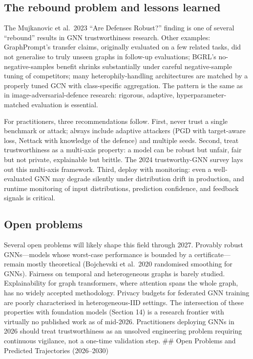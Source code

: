 \subsection{The rebound problem and lessons learned}\label{the-rebound-problem-and-lessons-learned}

The Mujkanovic et al.~2023 ``Are Defenses Robust?'' finding is one of several ``rebound'' results in GNN trustworthiness research. Other examples: GraphPrompt's transfer claims, originally evaluated on a few related tasks, did not generalise to truly unseen graphs in follow-up evaluations; BGRL's no-negative-samples benefit shrinks substantially under careful negative-sample tuning of competitors; many heterophily-handling architectures are matched by a properly tuned GCN with class-specific aggregation. The pattern is the same as in image-adversarial-defence research: rigorous, adaptive, hyperparameter-matched evaluation is essential.

For practitioners, three recommendations follow. First, never trust a single benchmark or attack; always include adaptive attackers (PGD with target-aware loss, Nettack with knowledge of the defence) and multiple seeds. Second, treat trustworthiness as a multi-axis property: a model can be robust but unfair, fair but not private, explainable but brittle. The 2024 trustworthy-GNN survey lays out this multi-axis framework. Third, deploy with monitoring: even a well-evaluated GNN may degrade silently under distribution drift in production, and runtime monitoring of input distributions, prediction confidence, and feedback signals is critical.

\subsection{Open problems}\label{open-problems}

Several open problems will likely shape this field through 2027. Provably robust GNNs---models whose worst-case performance is bounded by a certificate---remain mostly theoretical (Bojchevski et al.~2020 randomised smoothing for GNNs). Fairness on temporal and heterogeneous graphs is barely studied. Explainability for graph transformers, where attention spans the whole graph, has no widely accepted methodology. Privacy budgets for federated GNN training are poorly characterised in heterogeneous-IID settings. The intersection of these properties with foundation models (Section 14) is a research frontier with virtually no published work as of mid-2026. Practitioners deploying GNNs in 2026 should treat trustworthiness as an unsolved engineering problem requiring continuous vigilance, not a one-time validation step.
\#\# Open Problems and Predicted Trajectories (2026--2030)

